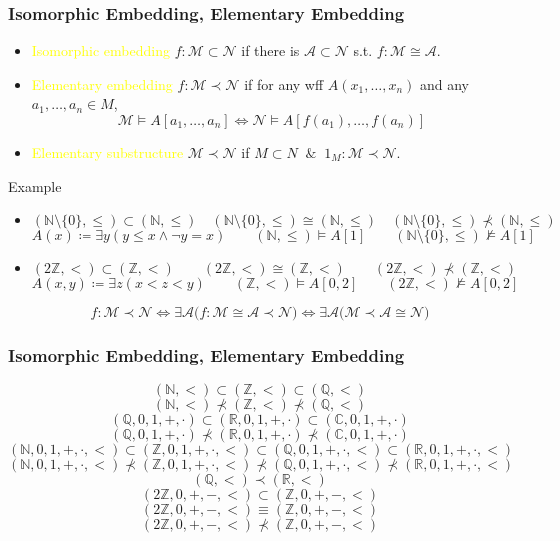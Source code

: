 \documentclass[UTF8,aspectratio=43,11pt,colorlinks,compress,openany]{beamer}%
\begin{document}
\begin{frame}\frametitle{Isomorphic Embedding, Elementary Embedding}
\setlength\abovedisplayskip{0pt}
\setlength\belowdisplayskip{0pt}
\begin{definition}
\begin{itemize}
	\item \textcolor{yellow}{Isomorphic embedding} $f:\mathcal{M}\subset\mathcal{N}$ if there is $\mathcal{A}\subset\mathcal{N}$ s.t. $f:\mathcal{M}\cong\mathcal{A}$.
	\item \textcolor{yellow}{Elementary embedding} $f:\mathcal{M}\prec\mathcal{N}$ if for any wff $A(x_1,\dots,x_n)$ and any $a_1,\dots,a_n\in M$,
	\[\mathcal{M}\vDash A[a_1,\dots,a_n]\iff\mathcal{N}\vDash A[f(a_1),\dots,f(a_n)]\]
	\item \textcolor{yellow}{Elementary substructure} $\mathcal{M}\prec\mathcal{N}$ if $M\subset N\;\;\&\;\;1_M:\mathcal{M}\prec\mathcal{N}$.
\end{itemize}
\end{definition}
\begin{block}{Example}
\begin{itemize}
	\item $(\mathbb{N}\setminus\{0\},\leq)\subset(\mathbb{N},\leq)\quad(\mathbb{N}\setminus\{0\},\leq)\cong(\mathbb{N},\leq)\quad(\mathbb{N}\setminus\{0\},\leq)\nprec(\mathbb{N},\leq)$
\[A(x)\coloneqq \exists y(y\leq x\wedge\neg y=x)\qquad(\mathbb{N},\leq)\vDash A[1]\qquad (\mathbb{N}\setminus\{0\},\leq)\nvDash A[1]\]
	\item $(2\mathbb{Z},<)\subset (\mathbb{Z},<)\qquad(2\mathbb{Z},<)\cong(\mathbb{Z},<)\qquad(2\mathbb{Z},<)\nprec(\mathbb{Z},<)$
	\[A(x,y)\coloneqq \exists z(x<z<y)\qquad(\mathbb{Z},<)\vDash A[0,2]\qquad(2\mathbb{Z},<)\nvDash A[0,2]\]
\end{itemize}
\end{block}
\[f:\mathcal{M}\prec\mathcal{N}\iff \exists \mathcal{A}\big(f:\mathcal{M}\cong\mathcal{A}\prec \mathcal{N}\big)\iff\exists \mathcal{A}\big(\mathcal{M}\prec\mathcal{A}\cong\mathcal{N}\big)\]
\end{frame}

\begin{frame}\frametitle{Isomorphic Embedding, Elementary Embedding}
\[(\mathbb{N},<)\subset(\mathbb{Z},<)\subset(\mathbb{Q},<)\]
\[(\mathbb{N},<)\nprec(\mathbb{Z},<)\nprec(\mathbb{Q},<)\]
\[(\mathbb{Q},0,1,+,\cdot)\subset(\mathbb{R},0,1,+,\cdot)\subset(\mathbb{C},0,1,+,\cdot)\]
\[(\mathbb{Q},0,1,+,\cdot)\nprec(\mathbb{R},0,1,+,\cdot)\nprec(\mathbb{C},0,1,+,\cdot)\]
\[(\mathbb{N},0,1,+,\cdot,<)\subset(\mathbb{Z},0,1,+,\cdot,<)\subset(\mathbb{Q},0,1,+,\cdot,<)\subset(\mathbb{R},0,1,+,\cdot,<)\]
\[(\mathbb{N},0,1,+,\cdot,<)\nprec(\mathbb{Z},0,1,+,\cdot,<)\nprec(\mathbb{Q},0,1,+,\cdot,<)\nprec(\mathbb{R},0,1,+,\cdot,<)\]
\[(\mathbb{Q},<)\prec(\mathbb{R},<)\]
\[(2\mathbb{Z},0,+,-,<)\subset(\mathbb{Z},0,+,-,<)\]
\[(2\mathbb{Z},0,+,-,<)\equiv(\mathbb{Z},0,+,-,<)\]
\[(2\mathbb{Z},0,+,-,<)\nprec(\mathbb{Z},0,+,-,<)\]
\end{frame}
\end{document}
